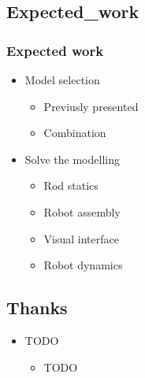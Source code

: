 \documentclass[compress]{thesisbeamer}
\begin{document}
      	\subsection{Expected_work}
        \begin{frame}
        	\frametitle{Expected work}
        	\begin{itemize}
        		\item Model selection
        		\begin{itemize}
        			\item Previusly presented 
        			\item Combination
        		\end{itemize}
        		\item Solve the modelling
  				\begin{itemize}%
   					\item Rod statics
   					\item Robot assembly
   					\item Visual interface
   					\item Robot dynamics
  				\end{itemize}
        	\end{itemize}
        \end{frame}
        	
        \subsection{Thanks}
        \begin{frame}
        	\begin{itemize}
        		\item 	TODO
        		\begin{itemize}
        			\item TODO
        		\end{itemize}
        	\end{itemize}
        \end{frame}
        	
\end{document}
